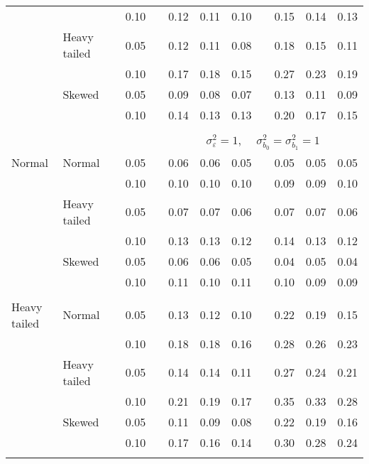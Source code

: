 \begin{table}[ht]
\begin{scriptsize}
\begin{tabular}{ll p{.1cm} c p{.1cm} rrr p{.1cm} rrr}
             &              && 0.10 &&  0.12 & 0.11 & 0.10 && 0.15 & 0.14 & 0.13 \\ 
             & Heavy tailed && 0.05 &&  0.12 & 0.11 & 0.08 && 0.18 & 0.15 & 0.11 \\ 
             &              && 0.10 &&  0.17 & 0.18 & 0.15 && 0.27 & 0.23 & 0.19 \\ 
             & Skewed       && 0.05 &&  0.09 & 0.08 & 0.07 && 0.13 & 0.11 & 0.09 \\ 
             &              && 0.10 &&  0.14 & 0.13 & 0.13 && 0.20 & 0.17 & 0.15 \\ 

&&&&&&&&&&&\\
& && && \multicolumn{7}{c}{$\sigma_{\varepsilon}^2 = 1$, \ \ $\sigma_{b_0}^2 = \sigma_{b_1}^2 = 1$} \\ \cline{6-12}
\rowcolor{gray!20}Normal       & Normal       && 0.05 &&  0.06 & 0.06 & 0.05 && 0.05 & 0.05 & 0.05 \\ 
\rowcolor{gray!20}             &              && 0.10 &&  0.10 & 0.10 & 0.10 && 0.09 & 0.09 & 0.10 \\ 
\rowcolor{gray!20}             & Heavy tailed && 0.05 &&  0.07 & 0.07 & 0.06 && 0.07 & 0.07 & 0.06 \\ 
\rowcolor{gray!20}             &              && 0.10 &&  0.13 & 0.13 & 0.12 && 0.14 & 0.13 & 0.12 \\ 
\rowcolor{gray!20}             & Skewed       && 0.05 &&  0.06 & 0.06 & 0.05 && 0.04 & 0.05 & 0.04 \\ 
\rowcolor{gray!20}             &              && 0.10 &&  0.11 & 0.10 & 0.11 && 0.10 & 0.09 & 0.09 \\ 
             &&&&&&&&&&&\\
Heavy tailed & Normal       && 0.05 &&  0.13 & 0.12 & 0.10 && 0.22 & 0.19 & 0.15 \\ 
             &              && 0.10 &&  0.18 & 0.18 & 0.16 && 0.28 & 0.26 & 0.23 \\ 
             & Heavy tailed && 0.05 &&  0.14 & 0.14 & 0.11 && 0.27 & 0.24 & 0.21 \\ 
             &              && 0.10 &&  0.21 & 0.19 & 0.17 && 0.35 & 0.33 & 0.28 \\ 
             & Skewed       && 0.05 &&  0.11 & 0.09 & 0.08 && 0.22 & 0.19 & 0.16 \\ 
             &              && 0.10 &&  0.17 & 0.16 & 0.14 && 0.30 & 0.28 & 0.24 \\ 
             &&&&&&&&&&&\\

\end{tabular}
\end{scriptsize}
\end{table}

